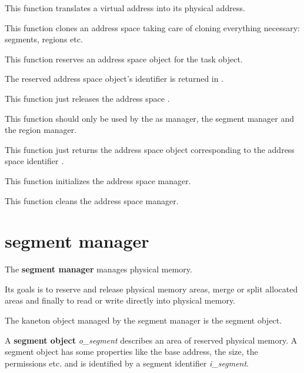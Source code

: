 	 {
	   This function translates a virtual address into its physical
	   address.
	 }

	 {
	   This function clones an address space taking care of cloning
	   everything necessary: segments, regions etc.
	 }

	 {
	   This function reserves an address space object for the
	   task  object.

	   The reserved address space object's identifier is returned
	   in .
	 }

	 {
	   This function just releases the address space .
	 }

	 {
	   This function should only be used by the as manager, the segment
	   manager and the region manager.

	   This function just returns the address space object
	   corresponding to the address space identifier .
	 }

	 {
	   This function initializes the address space manager.
	 }

	 {
	   This function cleans the address space manager.
	 }

%
%

\section{segment manager}

The \textbf{segment manager} manages physical memory.

Its goals is to reserve and release physical memory areas, merge or split
allocated areas and finally to read or write directly into physical memory.

The kaneton object managed by the segment manager is the segment object.

A \textbf{segment object} \textit{o\_segment} describes an area of reserved
physical memory. A segment object has some properties like the base
address, the size, the permissions etc. and is identified by a
segment identifier \textit{i\_segment}.

